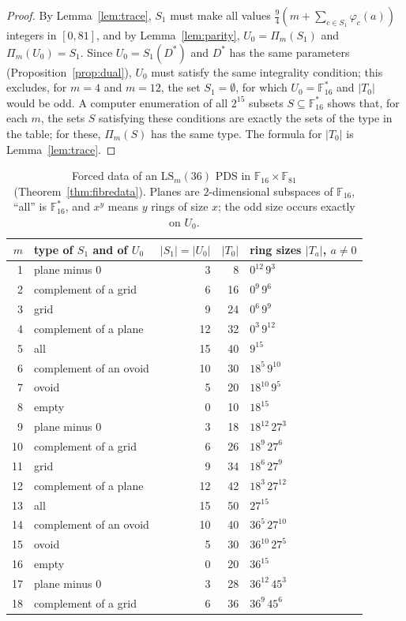 \documentclass[11pt]{amsart}
\theoremstyle{definition}
\newcommand{\F}{\mathbb{F}}
\newcommand{\LS}{\mathrm{LS}}
\begin{document}
\begin{proof}
By Lemma~\ref{lem:trace}, $S_1$ must make all values $\frac94(m+\sum_{c\in S_1}\varphi_c(a))$ integers in $[0,81]$, and by Lemma~\ref{lem:parity}, $U_0=\Pi_m(S_1)$ and $\Pi_m(U_0)=S_1$. Since $U_0=S_1(D^*)$ and $D^*$ has the same parameters (Proposition~\ref{prop:dual}), $U_0$ must satisfy the same integrality condition; this excludes, for $m=4$ and $m=12$, the set $S_1=\emptyset$, for which $U_0=\F_{16}^*$ and $|T_0|$ would be odd. A computer enumeration of all $2^{15}$ subsets $S\subseteq\F_{16}^*$ shows that, for each $m$, the sets $S$ satisfying these conditions are exactly the sets of the type in the table; for these, $\Pi_m(S)$ has the same type. The formula for $|T_0|$ is Lemma~\ref{lem:trace}.
\end{proof}

\begin{table}[ht]
\centering\small
\caption{Forced data of an $\LS_m(36)$ PDS in $\F_{16}\times\F_{81}$ (Theorem~\ref{thm:fibredata}). Planes are $2$-dimensional subspaces of $\F_{16}$, ``all'' is $\F_{16}^*$, and $x^y$ means $y$ rings of size $x$; the odd size occurs exactly on $U_0$.}\label{tab:fibredata}
\begin{tabular}{rlrrl}
\toprule
$m$ & type of $S_1$ and of $U_0$ & $|S_1|=|U_0|$ & $|T_0|$ & ring sizes $|T_a|$, $a\ne0$\\
\midrule
1 & plane minus $0$ & 3 & 8 & $0^{12}\,9^{3}$\\
2 & complement of a grid & 6 & 16 & $0^{9}\,9^{6}$\\
3 & grid & 9 & 24 & $0^{6}\,9^{9}$\\
4 & complement of a plane & 12 & 32 & $0^{3}\,9^{12}$\\
5 & all & 15 & 40 & $9^{15}$\\
6 & complement of an ovoid & 10 & 30 & $18^{5}\,9^{10}$\\
7 & ovoid & 5 & 20 & $18^{10}\,9^{5}$\\
8 & empty & 0 & 10 & $18^{15}$\\
9 & plane minus $0$ & 3 & 18 & $18^{12}\,27^{3}$\\
10 & complement of a grid & 6 & 26 & $18^{9}\,27^{6}$\\
11 & grid & 9 & 34 & $18^{6}\,27^{9}$\\
12 & complement of a plane & 12 & 42 & $18^{3}\,27^{12}$\\
13 & all & 15 & 50 & $27^{15}$\\
14 & complement of an ovoid & 10 & 40 & $36^{5}\,27^{10}$\\
15 & ovoid & 5 & 30 & $36^{10}\,27^{5}$\\
16 & empty & 0 & 20 & $36^{15}$\\
17 & plane minus $0$ & 3 & 28 & $36^{12}\,45^{3}$\\
18 & complement of a grid & 6 & 36 & $36^{9}\,45^{6}$\\
\bottomrule
\end{tabular}
\end{table}
\end{document}

